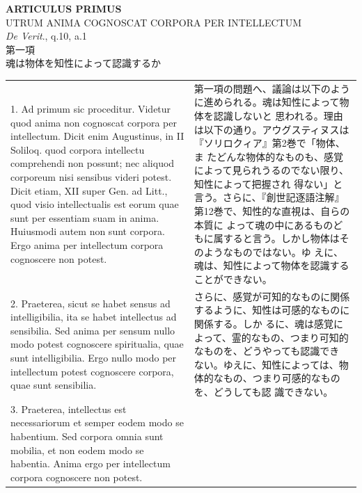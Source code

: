 \documentclass[paper=a4paper,fontsize=10pt,jafontsize=9pt,titlepage]{jlreq}
\begin{document}
\begin{center}
{\Large {\bfseries ARTICULUS PRIMUS}}\\
{\large UTRUM ANIMA COGNOSCAT CORPORA PER INTELLECTUM}\\
{\footnotesize {\itshape De Verit}., q.10, a.1}\\
{\Large 第一項\\魂は物体を知性によって認識するか}
\end{center}

\begin{longtable}{p{21em}p{21em}}
1. Ad primum sic proceditur. Videtur quod anima non cognoscat corpora per
intellectum. Dicit enim Augustinus, in II Soliloq. quod corpora intellectu
comprehendi non possunt; nec aliquod corporeum nisi sensibus videri
potest. Dicit etiam, XII super Gen. ad Litt., quod visio intellectualis est
eorum quae sunt per essentiam suam in anima. Huiusmodi autem non sunt
corpora. Ergo anima per intellectum corpora cognoscere non potest.
 
 &

第一項の問題へ、議論は以下のように進められる。魂は知性によって物体を認識しないと
思われる。理由は以下の通り。アウグスティヌスは『ソリロクィア』第2巻で「物体、ま
たどんな物体的なものも、感覚によって見られうるのでない限り、知性によって把握され
得ない」と言う。さらに、『創世記逐語注解』第12巻で、知性的な直視は、自らの本質に
よって魂の中にあるものどもに属すると言う。しかし物体はそのようなものではない。ゆ
えに、魂は、知性によって物体を認識することができない。
 
\\[1em] 

2. Praeterea, sicut se habet sensus ad intelligibilia, ita se habet intellectus ad
 sensibilia. Sed anima per sensum nullo modo potest cognoscere spiritualia, quae
 sunt intelligibilia. Ergo nullo modo per intellectum potest cognoscere corpora,
 quae sunt sensibilia.

 &

 さらに、感覚が可知的なものに関係するように、知性は可感的なものに関係する。しか
 るに、魂は感覚によって、霊的なもの、つまり可知的なものを、どうやっても認識でき
 ない。ゆえに、知性によっては、物体的なもの、つまり可感的なものを、どうしても認
 識できない。
 
 \\[1em]

 3. Praeterea, intellectus est necessariorum et semper eodem modo se habentium. Sed
 corpora omnia sunt mobilia, et non eodem modo se habentia. Anima ergo per
 intellectum corpora cognoscere non potest.


\end{longtable}
\end{document}
